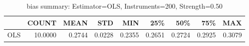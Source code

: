 \begin{table}[ht]
\centering
\caption{bias summary: Estimator=OLS, Instruments=200, Strength=0.50}
\begin{tabular}{lrrrrrrrr}
\toprule
 & COUNT & MEAN & STD & MIN & 25\% & 50\% & 75\% & MAX \\
\midrule
OLS & 10.0000 & 0.2744 & 0.0228 & 0.2355 & 0.2651 & 0.2724 & 0.2925 & 0.3079 \\
\bottomrule
\end{tabular}
\end{table}

